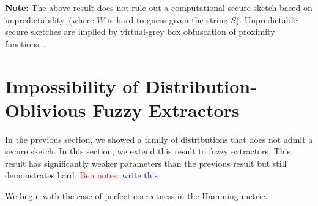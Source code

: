 \documentclass[11pt]{article}
\newcommand{\class}[1]{{\ensuremath{\mathsf{#1}}}}
\newcommand{\sketch}{\ensuremath{\class{SS}}\xspace}
\newcommand{\rec}{\ensuremath{\class{Rec}}\xspace}
\newtheorem{corollary}[theorem]{Corollary}
\newcommand{\authnote}[2]{{\textcolor{red}{\textsf{#1 notes: }\textcolor{blue}{ #2}}\marginpar{\textcolor{red}{\textbf{!!!!!}}}}}
\newcommand{\authnote}[2]{}
\newcommand{\bnote}[1]{{\authnote{Ben}{#1}}}
\begin{document}

\textbf{Note:} The above result does not rule out a computational secure sketch based on unpredictability~(where $W$ is hard to guess given the string $S$).  Unpredictable secure sketches are implied by virtual-grey box obfuscation of proximity functions~\cite{BitanskyCKP14}.  

\section{Impossibility of Distribution-Oblivious Fuzzy Extractors}
In the previous section, we showed a family of distributions that does not admit a secure sketch.  In this section, we extend this result to fuzzy extractors.  This result has significantly weaker parameters than the previous result but still demonstrates hard.  \bnote{write this}

We begin with the case of perfect correctness in the Hamming metric.  
\end{document}
